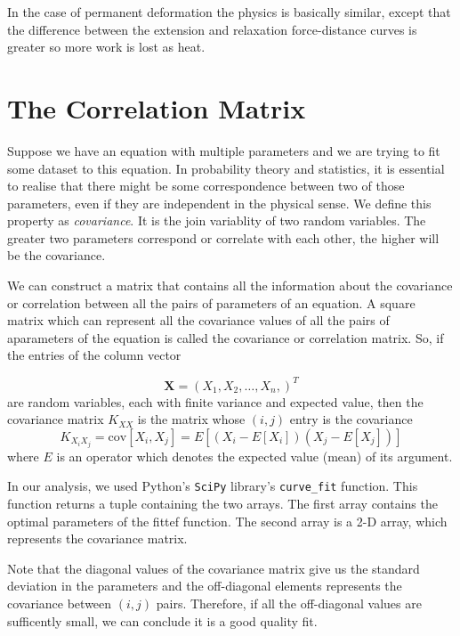 In the case of permanent deformation the physics is basically similar, except that the difference between the extension and relaxation force-distance curves is greater so more work is lost as heat.

\section{The Correlation Matrix}

Suppose we have an equation with multiple parameters and we are trying to fit some dataset to this equation. In probability theory and statistics, it is essential to realise that there might be some correspondence between two of those parameters, even if they are independent in the physical sense. We define this property as \textit{covariance}. It is the join variablity of two random variables. The greater two parameters correspond or correlate with each other, the higher will be the covariance.

We can construct a matrix that contains all the information about the covariance or correlation between all the pairs of parameters of an equation. A square matrix which can represent all the covariance values of all the pairs of aparameters of the equation is called the covariance or correlation matrix. So, if the entries of the column vector 

\begin{equation}
	\mathbf{X} = (X_1, X_2, \ldots, X_n,)^{T}
\end{equation}
are random variables, each with finite variance and expected value, then the covariance matrix $ K_{XX} $ is the matrix whose $ (i, j) $ entry is the covariance
\begin{equation}
	K_{X_i X_j} = \text{cov} [X_i, X_j]	= E [(X_i - E[X_i])(X_j - E[X_j])]
\end{equation}
where $ E $ is an operator which denotes the expected value (mean) of its argument.

In our analysis, we used Python's \texttt{SciPy} library's \texttt{curve\_fit} function. This function returns a tuple containing the two arrays. The first array contains the optimal parameters of the fittef function. The second array is a 2-D array, which represents the covariance matrix. 

Note that the diagonal values of the covariance matrix give us the standard deviation in the parameters and the off-diagonal elements represents the covariance between $ (i, j) $ pairs. Therefore, if all the off-diagonal values are sufficently small, we can conclude it is a good quality fit.



    



